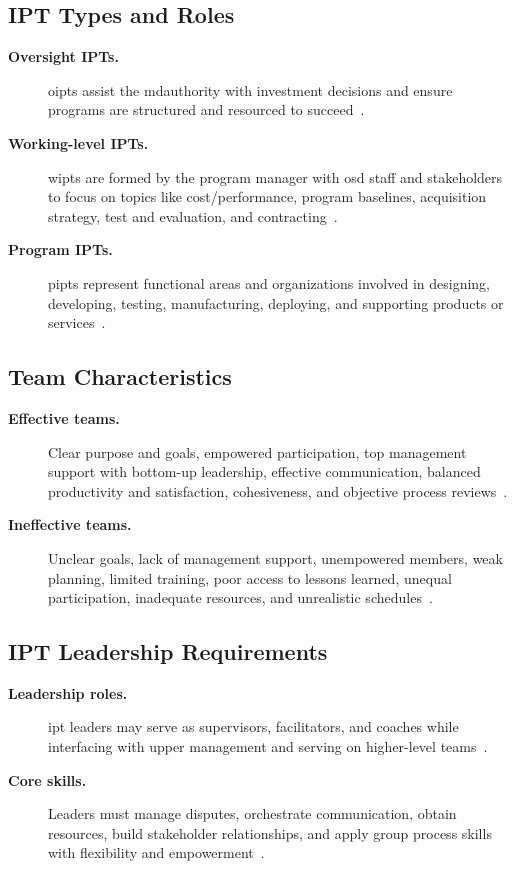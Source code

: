 \documentclass[../main.tex]{subfiles}
\begin{document}
\subsection{IPT Types and Roles}
\begin{description}
  \item[\textbf{Oversight IPTs.}] \acp{oipt} assist the \ac{mdauthority} with investment decisions and ensure programs are structured and resourced to succeed~\autocite{edo-5-1-5-team-building-2025}.
  \item[\textbf{Working-level IPTs.}] \acp{wipt} are formed by the program manager with \ac{osd} staff and stakeholders to focus on topics like cost/performance, program baselines, acquisition strategy, test and evaluation, and contracting~\autocite{edo-5-1-5-team-building-2025}.
  \item[\textbf{Program IPTs.}] \acp{pipt} represent functional areas and organizations involved in designing, developing, testing, manufacturing, deploying, and supporting products or services~\autocite{edo-5-1-5-team-building-2025}.
\end{description}

\subsection{Team Characteristics}
\begin{description}
  \item[\textbf{Effective teams.}] Clear purpose and goals, empowered participation, top management support with bottom-up leadership, effective communication, balanced productivity and satisfaction, cohesiveness, and objective process reviews~\autocite{edo-5-1-5-team-building-2025}.
  \item[\textbf{Ineffective teams.}] Unclear goals, lack of management support, unempowered members, weak planning, limited training, poor access to lessons learned, unequal participation, inadequate resources, and unrealistic schedules~\autocite{edo-5-1-5-team-building-2025}.
\end{description}

\subsection{IPT Leadership Requirements}
\begin{description}
  \item[\textbf{Leadership roles.}] \ac{ipt} leaders may serve as supervisors, facilitators, and coaches while interfacing with upper management and serving on higher-level teams~\autocite{edo-5-1-5-team-building-2025}.
  \item[\textbf{Core skills.}] Leaders must manage disputes, orchestrate communication, obtain resources, build stakeholder relationships, and apply group process skills with flexibility and empowerment~\autocite{edo-5-1-5-team-building-2025}.
\end{description}
\end{document}
